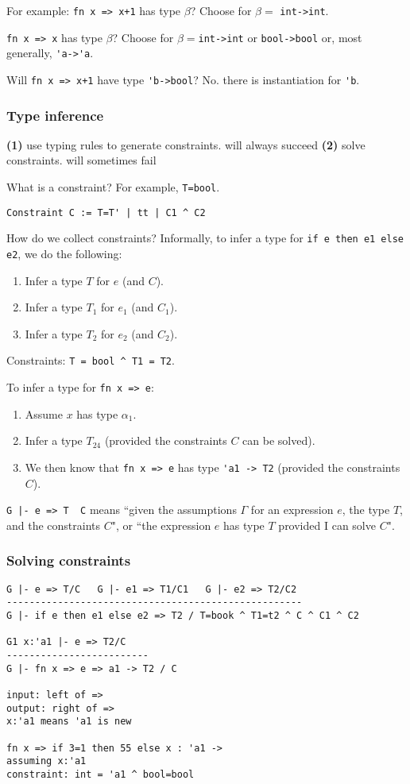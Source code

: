 \documentclass[11pt]{article}
\begin{document}
For example: \verb~fn x => x+1~ has type $\beta$? Choose for $\beta =$ \verb~int->int~.

\verb~fn x => x~ has type $\beta$? Choose for $\beta=$\verb~int->int~ or \verb~bool->bool~ or, most generally, \verb~'a->'a~.

Will \verb~fn x => x+1~ have type \verb~'b->bool~? No. there is instantiation for \verb~'b~.

\subsubsection{Type inference}
\textbf{(1)} use typing rules to generate constraints. \textleftarrow will always succeed
\textbf{(2)} solve constraints. \textleftarrow will sometimes fail

What is a constraint? For example, \verb~T=bool~.

\begin{verbatim}
Constraint C := T=T' | tt | C1 ^ C2
\end{verbatim}

How do we collect constraints? Informally, to infer a type for \verb~if e then e1 else e2~, we do the following:
\begin{enumerate}
    \item Infer a type $T$ for $e$ (and $C$).
    \item Infer a type $T_1$ for $e_1$ (and $C_1$).
    \item Infer a type $T_2$ for $e_2$ (and $C_2$).
\end{enumerate}
Constraints: \verb~T = bool ^ T1 = T2~.

To infer a type for \verb~fn x => e~:
\begin{enumerate}
    \item Assume $x$ has type $\alpha_1$.
    \item Infer a type $T_24$ (provided the constraints $C$ can be solved).
    \item We then know that \verb~fn x => e~ has type \verb~'a1 -> T2~ (provided the constraints $C$).
\end{enumerate}

\verb~G |- e => T  C~ means ``given the assumptions $\Gamma$ for an expression $e$, the type $T$, and the constraints $C$", or ``the expression $e$ has type $T$ provided I can solve $C$".

\subsubsection{Solving constraints}
\begin{verbatim}
G |- e => T/C   G |- e1 => T1/C1   G |- e2 => T2/C2
----------------------------------------------------
G |- if e then e1 else e2 => T2 / T=book ^ T1=t2 ^ C ^ C1 ^ C2

G1 x:'a1 |- e => T2/C
-------------------------
G |- fn x => e => a1 -> T2 / C

input: left of =>
output: right of =>
x:'a1 means 'a1 is new

fn x => if 3=1 then 55 else x : 'a1 ->
assuming x:'a1
constraint: int = 'a1 ^ bool=bool
\end{verbatim}
\end{document}
